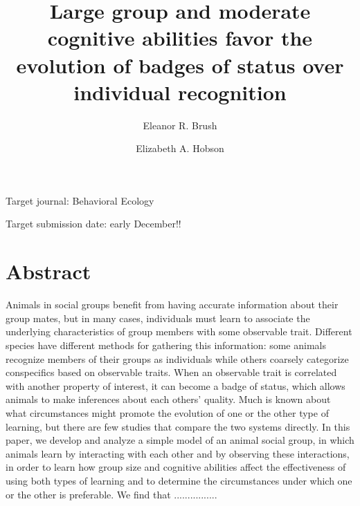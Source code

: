 

\noindent
\title{Large group and moderate cognitive abilities favor the evolution of badges of status over individual recognition} 

\author[1]{Eleanor R. Brush}

\author[2,3]{Elizabeth A. Hobson}
\maketitle

Target journal: Behavioral Ecology 

Target submission date: early December!!

\linenumbers
\section*{Abstract}
Animals in social groups benefit from having accurate information about their group mates, but in many cases, individuals must learn to associate the underlying characteristics of group members with some observable trait. Different species have different methods for gathering this information: some animals recognize members of their groups as individuals while others coarsely categorize conspecifics based on observable traits. When an observable trait is correlated with another property of interest, it can become a badge of status, which allows animals to make inferences about each others' quality. Much is known about what circumstances might promote the evolution of one or the other type of learning, but there are few studies that compare the two systems directly. In this paper, we develop and analyze a simple model of an animal social group, in which animals learn by interacting with each other and by observing these interactions, in order to learn how group size and cognitive abilities affect the effectiveness of using both types of learning and to determine the circumstances under which one or the other is preferable. We find that ................



